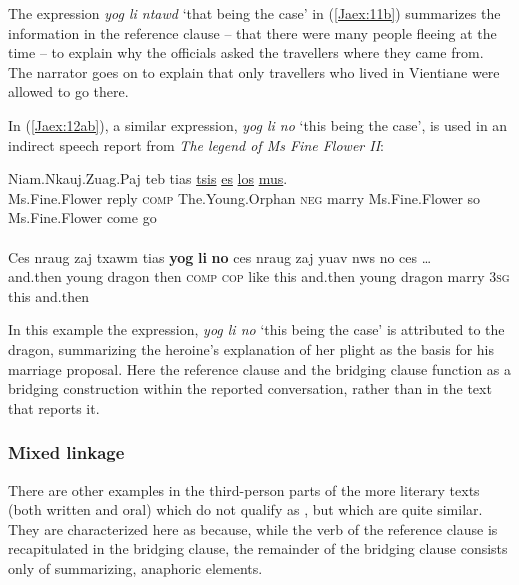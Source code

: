 \documentclass[output=paper]{LSP/langsci}
\begin{document}
\noindent
The expression \textit{yog li ntawd} `that being the case' in (\ref{Jaex:11b}) summarizes the information in the reference clause – that there were many people fleeing at the time – to explain why the officials asked the travellers where they came from. The narrator goes on to explain that only travellers who lived in Vientiane were allowed to go there.
 
In (\ref{Jaex:12ab}), a similar expression, \textit{yog li no} `this being the case', is used in an indirect speech report from \textit{The legend of Ms Fine Flower II}:
 
\begin{exe}
\ex \label{Jaex:12ab}
\begin{xlist}
\ex \label{Jaex:12a}
\gll Niam.Nkauj.Zuag.Paj teb tias \underline{} \underline{tsis} \underline{} \underline{} \underline{es} \underline{}     \underline{los} \underline{mus}.        \\
 Ms.Fine.Flower reply \textsc{comp} The.Young.Orphan \textsc{neg} marry Ms.Fine.Flower so Ms.Fine.Flower come  go\\
\glt {}\\
\ex \label{Jaex:12b}
\gll Ces nraug  zaj txawm tias \textbf{yog} \textbf{li}  \textbf{no}  ces nraug  zaj   yuav   nws  no  ces …\\     	      
     and.then young dragon then \textsc{comp} \textsc{cop} like this and.then young dragon marry \textsc{3sg} this and.then\\
\glt {} \citep[][163]{johnson92}
\end{xlist}
\end{exe}


\noindent
In this example the expression, \textit{yog li no} `this being the case' is attributed to the dragon, summarizing the heroine’s explanation of her plight as the basis for his marriage proposal. Here the reference clause and the bridging clause function as a bridging construction within the reported conversation, rather than in the  text that reports it.

\subsubsection{Mixed linkage}
\label{JaMixed}
There are other examples in the third-person  parts of the more literary texts (both written and oral) which do not qualify as , but which are quite similar. They are characterized here as  because, while the verb of the reference clause is recapitulated in the bridging clause, the remainder of the bridging clause consists only of summarizing, anaphoric elements.
\end{document}
